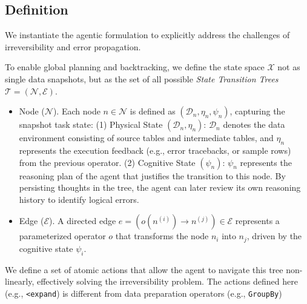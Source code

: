 \subsection{Definition}

We instantiate the agentic formulation to explicitly address the challenges of irreversibility and error propagation.

To enable global planning and backtracking, we define the state space $\mathcal{X}$ not as single data snapshots, but as the set of all possible \textit{State Transition Trees} $\mathcal{T} = (\mathcal{N}, \mathcal{E})$. 

\begin{itemize}[leftmargin=1em]
    \item {Node ($\mathcal{N}$)}. Each node $n \in \mathcal{N}$ is defined as $(\mathcal{D}_n, \eta_n, \psi_n)$, capturing the snapshot task state: (1) {Physical State} $(\mathcal{D}_n, \eta_n)$: $\mathcal{D}_n$ denotes the data environment consisting of source tables and intermediate tables, and $\eta_n$ represents the execution feedback (e.g., error tracebacks, or sample rows) from the previous operator. (2) {Cognitive State} $(\psi_n)$: $\psi_n$ represents the reasoning plan of the agent that justifies the transition to this node. By persisting thoughts in the tree, the agent can later review its own reasoning history to identify logical errors.
    \item {Edge ($\mathcal{E}$).} A directed edge $e = (o(n^{(i)}) \rightarrow n^{(j)}) \in \mathcal{E}$ represents a parameterized operator $o$ that transforms the node $n_i$ into $n_j$, driven by the cognitive state $\psi_i$. 
\end{itemize}

We define a set of atomic actions that allow the agent to navigate this tree non-linearly, effectively solving the irreversibility problem. The actions defined here (e.g., \texttt{<expand}) is different from data preparation operators (e.g., \texttt{GroupBy})

